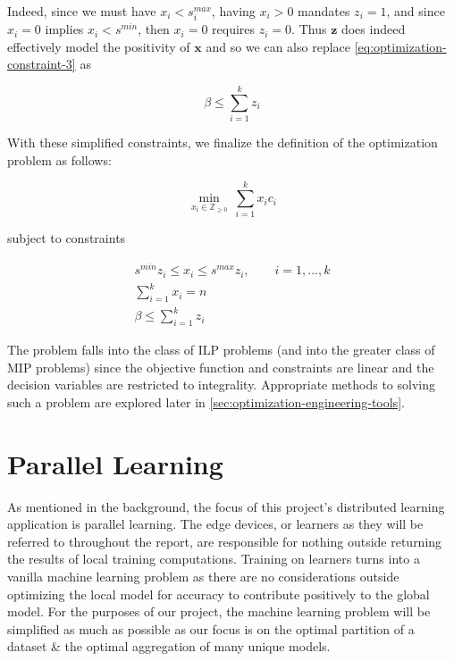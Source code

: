 \documentclass[../mthe-493-final-project.tex]{subfiles}
\begin{document}
     Indeed, since we must have $x_i < s_i^{max}$, having $x_i > 0$ mandates $z_i = 1$, and since $x_i = 0$ implies $x_i < s^{min}$, then $x_i = 0$ requires $z_i = 0$. Thus $\mathbf{z}$ does indeed effectively model the positivity of $\mathbf{x}$ and so we can also replace \eqref{eq:optimization-constraint-3} as
     
     \begin{equation}
         \beta \leq \sum_{i = 1}^k z_i
     \end{equation}
    
    With these simplified constraints, we finalize the definition of the optimization problem as follows:
    
    \begin{equation}
        \label{eq:optimization-objective-function-simplified}
        \min_{x_i \in \mathbb{Z}_{\geq 0}} \ \sum_{i=1}^k x_i c_i
    \end{equation}

    subject to constraints

    \begin{align}
        s^{min}z_i \leq x_i \leq s^{max}z_i, \qquad i=1,...,k \label{eq:simplified-optimization-constraint-1} \\
        \sum_{i = 1}^k x_i = n \label{eq:simplified-optimization-constraint-2} \qquad \qquad \qquad\\
        \beta \leq \sum_{i = 1}^k z_i \label{eq:simplified-optimization-constraint-3} \qquad \qquad \qquad
    \end{align}

    The problem falls into the class of ILP problems (and into the greater class of MIP problems) since the objective function and constraints are linear and the decision variables are restricted to integrality. Appropriate methods to solving such a problem are explored later in \autoref{sec:optimization-engineering-tools}.

    \section{Parallel Learning}
    \label{sec:parallel-learning-problem-description}
    As mentioned in the background, the focus of this project’s distributed learning application is parallel learning. The edge devices, or learners as they will be referred to throughout the report, are responsible for nothing outside returning the results of local training computations. Training on learners turns into a vanilla machine learning problem as there are no considerations outside optimizing the local model for accuracy to contribute positively to the global model. For the purposes of our project, the machine learning problem will be simplified as much as possible as our focus is on the optimal partition of a dataset \& the optimal aggregation of many unique models.
\end{document}
